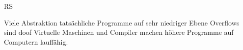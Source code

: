 \documentclass[12pt]{article}
\begin{document}
RS

Viele Abstraktion
tatsächliche Programme auf sehr niedriger Ebene
Overflows sind doof
Virtuelle Maschinen und Compiler machen höhere Programme auf Computern
lauffähig.
\end{document}

